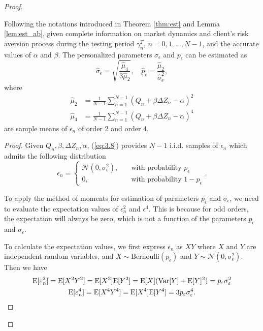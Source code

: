 \begin{proof}
\begin{lemma}\label{lem:est_eps}
    Following the notations introduced in Theorem \ref{thm:est} and Lemma \ref{lem:est_ab}, given complete information on market dynamics and client's risk aversion process during the testing period $\gamma_n^T$, $n=0,1,\ldots,N-1$, and the accurate values of $\alpha$ and $\beta$. The personalized parameters $\sigma_\epsilon$ and $p_\epsilon$ can be estimated as $$
    \hat\sigma_\epsilon=\sqrt{\frac{\hat \mu_4}{3\hat\mu_2}}, \quad \hat p_\epsilon = \frac{\hat\mu_2}{\hat\sigma_\epsilon^2},
    $$ where \begin{equation}
        \begin{aligned}
            \hat\mu_2&=\frac{1}{N-1}\sum_{n=1}^{N-1} (Q_n+\beta\Delta Z_n-\alpha)^2\\
            \hat\mu_4&=\frac{1}{N-1}\sum_{n=1}^{N-1} (Q_n+\beta\Delta Z_n-\alpha)^4
        \end{aligned}\label{eq:3.9}
    \end{equation} are sample means of $\epsilon_n$ of order 2 and order 4.
\end{lemma}
\begin{proof}
    Given $Q_n,\beta,\Delta Z_n,\alpha$, (\ref{eq:3.8}) provides $N-1$ i.i.d. samples of $\epsilon_n$ which admits the following distribution $$
        \epsilon_n=\begin{cases}
        \mathcal{N}(0,\sigma_\epsilon^2),\quad&\text{with probability } p_\epsilon\\
        0,\quad&\text{with probability } 1-p_\epsilon
        \end{cases}.
    $$

    To apply the method of moments for estimation of parameters $p_\epsilon$ and $\sigma_\epsilon$, we need to evaluate the expectation values of $\epsilon_n^2$ and $\epsilon^4$. This is because for odd orders, the expectation will always be zero, which is not a function of the parameters $p_\epsilon$ and $\sigma_\epsilon$.

    To calculate the expectation values, we first express $\epsilon_n$ as $XY$ where $X$ and $Y$ are independent random variables, and $X\sim\text{Bernoulli}(p_\epsilon)$ and $Y\sim\mathcal{N}(0,\sigma_\epsilon^2)$. Then we have \begin{gather*}
        \mathrm{E}[\varepsilon_n^2]=\mathrm{E}[X^2Y^2]=\mathrm{E}[X^2]\mathrm{E}[Y^2]=\mathrm{E}[X](\mathrm{Var}[Y]+\mathrm{E}[Y]^2)=p_\varepsilon\sigma_\varepsilon^2\\
        \mathrm{E}[\varepsilon_n^4]=\mathrm{E}[X^4Y^4]=\mathrm{E}[X^4]\mathrm{E}[Y^4]=3p_\varepsilon\sigma_\varepsilon^4.
    \end{gather*}
    

\end{proof}
\end{proof}
